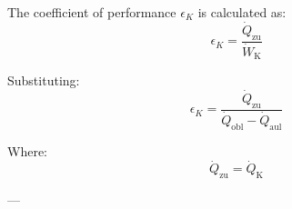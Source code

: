 The coefficient of performance \( \epsilon_K \) is calculated as:  
\[
\epsilon_K = \frac{\dot{Q}_{\text{zu}}}{\dot{W}_{\text{K}}}
\]  

Substituting:  
\[
\epsilon_K = \frac{\dot{Q}_{\text{zu}}}{\dot{Q}_{\text{obl}} - \dot{Q}_{\text{aul}}}
\]  

Where:  
\[
\dot{Q}_{\text{zu}} = \dot{Q}_{\text{K}}
\]  

---